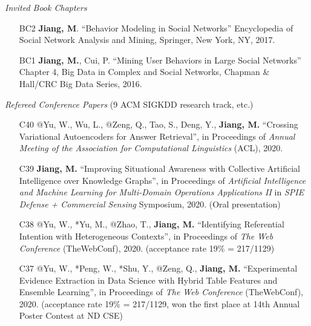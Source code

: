 \documentclass[10pt]{article}
\newenvironment{myindentpar}[1]%
{\begin{list}{}%
         {\setlength{\leftmargin}{#1}}%
         \item[]%
}
{\end{list}}
\newcounter{list}
\begin{document}
\begin{myindentpar}{0.00cm}

\hspace{-0.25cm}\emph{Invited Book Chapters}

\begin{enumerate}[leftmargin=.5cm]

\item[BC2] \textbf{Jiang, M}. ``Behavior Modeling in Social Networks'' Encyclopedia of Social Network Analysis and Mining, Springer, New York, NY, 2017.
		
\item[BC1] \textbf{Jiang, M.}, Cui, P. ``Mining User Behaviors in Large Social Networks'' Chapter 4, Big Data in Complex and Social Networks, Chapman \& Hall/CRC Big Data Series, 2016.

\end{enumerate}

\hspace{-0.25cm}\emph{Refereed Conference Papers} {\small (9 ACM SIGKDD research track, etc.)}

\begin{enumerate}[leftmargin=.5cm]

\item[C40] @Yu, W., Wu, L., @Zeng, Q., Tao, S., Deng, Y., \textbf{Jiang, M.} ``Crossing Variational Autoencoders for Answer Retrieval'', in Proceedings of \textit{Annual Meeting of the Association for Computational Linguistics} (ACL), 2020.

\item[C39] \textbf{Jiang, M.} ``Improving Situational Awareness with Collective Artificial Intelligence over Knowledge Graphs'', in Proceedings of \textit{Artificial Intelligence and Machine Learning for Multi-Domain Operations Applications II} in \textit{SPIE Defense + Commercial Sensing} Symposium, 2020. (Oral presentation)

\item[C38] @Yu, W., *Yu, M., @Zhao, T., \textbf{Jiang, M.} ``Identifying Referential Intention with Heterogeneous Contexts'', in Proceedings of \textit{The Web Conference} (TheWebConf), 2020. (acceptance rate 19\% = 217/1129)

\item[C37] @Yu, W., *Peng, W., *Shu, Y., @Zeng, Q., \textbf{Jiang, M.} ``Experimental Evidence Extraction in Data Science with Hybrid Table Features and Ensemble Learning'', in Proceedings of \textit{The Web Conference} (TheWebConf), 2020. (acceptance rate 19\% = 217/1129, won the first place at 14th Annual Poster Contest at ND CSE)


\end{enumerate}
\end{myindentpar}
\end{document}
